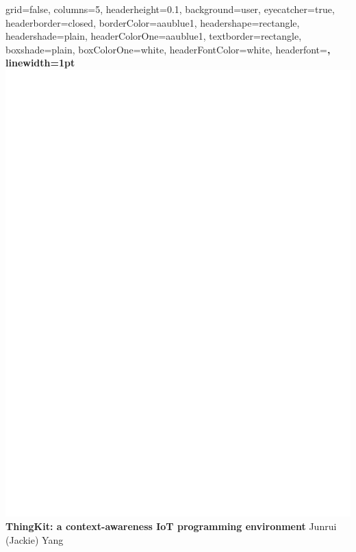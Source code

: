 \documentclass[a0paper,portrait]{baposter}
\begin{document}
\begin{poster}{
  grid=false,
  columns=5,
  headerheight=0.1\textheight,
  background=user,
  eyecatcher=true,
  headerborder=closed,
  borderColor=aaublue1,
  headershape=rectangle,
  headershade=plain,
  headerColorOne=aaublue1,
  textborder=rectangle,
  boxshade=plain,
  boxColorOne=white,
  headerFontColor=white,
  headerfont=\Large\sf\bf,
  linewidth=1pt
}
{
  \includegraphics[height=0.75\headerheight]{CMU_white}
}
{\color{white}\bf
  ThingKit: a context-awareness IoT programming environment
}
{\color{white}\small
  \vspace{1em} Junrui (Jackie) Yang 
}
\end{poster}
\end{document}

